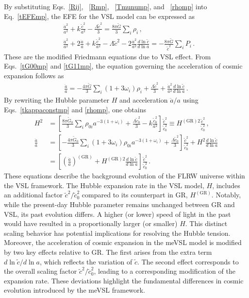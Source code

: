 \documentclass[jkps,preprint,fleqn]{revtex4} %
\newcommand{\tc}{\tilde{c}}
\newcommand{\tG}{\tilde{G}}
\newcommand{\GR}{\text{GR}}
\begin{document}
By substituting Eqs.~\eqref{Rij}, ~\eqref{Rmp}, ~\eqref{Tmunump}, and ~\eqref{rhomp} into Eq.~\eqref{tEFEmp}, the EFE for the VSL model can be expressed as
 \begin{align}
 &\frac{\dot{a}^2}{a^2} + k \frac{\tc^2}{a^2}  -\frac{ \Lambda \tc^2}{3} = \frac{8 \pi \tG}{3} \sum_i \rho_i \label{tG00mp} \,, \\
 &\frac{\dot{a}^2}{a^2} + 2 \frac{\ddot{a}}{a} +  k \frac{\tc^2}{a^2} - \Lambda \tc^2 - 2 \frac{\dot{a}^2}{a^2} \frac{d \ln \tc}{d \ln a} = -\frac{8 \pi \tG}{\tc^2} \sum_{i} P_i  \label{tG11mp} \,.
 \end{align}
These are the modified Friedmann equations due to VSL effect. From Eqs.~\eqref{tG00mp} and \eqref{tG11mp}, the equation governing the acceleration of cosmic expansion follows as
 \begin{align}
 \frac{\ddot{a}}{a} = -\frac{4\pi \tG}{3} \sum_i \left( 1 + 3 \omega_i \right) \rho_i  + \frac{\Lambda \tc^2}{3} + \frac{\dot{a}^2}{a^2} \frac{d \ln \tc}{d \ln a} \label{t3G11mG00mp} \,.
 \end{align}
By rewriting the Hubble parameter $H$ and acceleration $\ddot{a}/a$ using Eqs.~\eqref{tkappaconstmp} and \eqref{rhomp}, one obtains
 \begin{align}
 H^2 &= \left[ \frac{8 \pi \tG_0}{3} \sum_{i} \rho_{0i} a^{-3(1+\omega_i)} + \frac{ \Lambda \tc_0^2}{3} - k \frac{\tc_0^2}{a^2} \right] \frac{\tc^2}{\tc_0^2} \equiv H^{(\GR)2} \frac{\tc^2}{\tc_0^2} \label{H2me} \,, \\
 \frac{\ddot{a}}{a} &= \left[ -\frac{4\pi \tG_0}{3} \sum_i \left( 1 + 3 \omega_i \right) \rho_{0i} a^{-3(1+\omega_i)} + \frac{\Lambda \tc_0^2}{3} \right] \frac{\tc^2}{\tc_0^2} + H^2 \frac{d \ln \tc}{d \ln a} \nonumber \\
 &= \left[ \left( \frac{\ddot{a}}{a} \right)^{(\GR)} +  H^{(\GR)2} \frac{d \ln \tc}{d \ln a}  \right] \frac{\tc^2}{\tc_0^2} \label{ddotaoa} \,.
 \end{align}
These equations describe the background evolution of the FLRW universe within the VSL framework. The Hubble expansion rate in the VSL model, $H$, includes an additional factor $\tc^2/\tc_0^2$ compared to its counterpart in GR, $H^{(\GR)}$. Notably, while the present-day Hubble parameter remains unchanged between GR and VSL, its past evolution differs. A higher (or lower) speed of light in the past would have resulted in a proportionally larger (or smaller) $H$. This distinct scaling behavior has potential implications for resolving the Hubble tension.
Moreover, the acceleration of cosmic expansion in the meVSL model is modified by two key effects relative to GR. The first arises from the extra term $d \ln \tc/d \ln a$, which reflects the variation of $\tc$. The second effect corresponds to the overall scaling factor $\tc^2/\tc_0^2$, leading to a corresponding modification of the expansion rate. These deviations highlight the fundamental differences in cosmic evolution introduced by the meVSL framework.  
\end{document}
